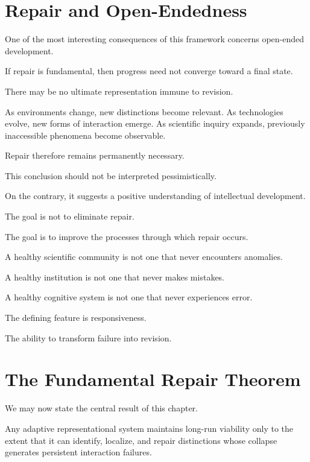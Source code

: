 \documentclass[11pt,oneside,openany]{book}
\begin{document}
\section{Repair and Open-Endedness}

One of the most interesting consequences of this framework concerns open-ended development.

If repair is fundamental, then progress need not converge toward a final state.

There may be no ultimate representation immune to revision.

As environments change, new distinctions become relevant. As technologies evolve, new forms of interaction emerge. As scientific inquiry expands, previously inaccessible phenomena become observable.

Repair therefore remains permanently necessary.

This conclusion should not be interpreted pessimistically.

On the contrary, it suggests a positive understanding of intellectual development.

The goal is not to eliminate repair.

The goal is to improve the processes through which repair occurs.

A healthy scientific community is not one that never encounters anomalies.

A healthy institution is not one that never makes mistakes.

A healthy cognitive system is not one that never experiences error.

The defining feature is responsiveness.

The ability to transform failure into revision.

\section{The Fundamental Repair Theorem}

We may now state the central result of this chapter.

\begin{theorem}

Any adaptive representational system maintains long-run viability only to the extent that it can identify, localize, and repair distinctions whose collapse generates persistent interaction failures.

\end{theorem}
\end{document}

